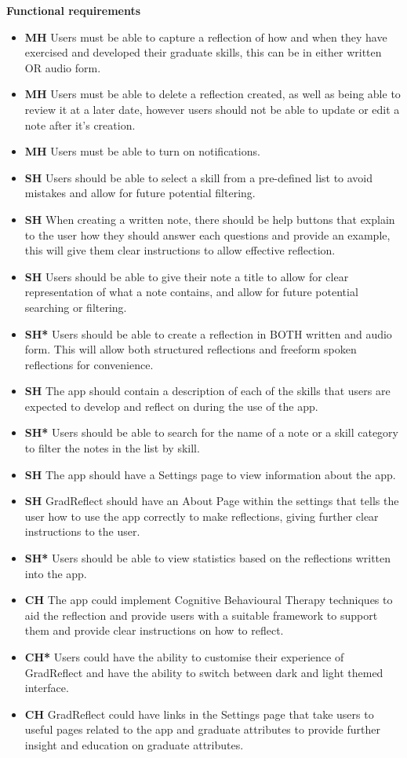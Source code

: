 \documentclass{l4proj}
\begin{document}
\textbf{Functional requirements}
\begin{itemize}
    \item \textbf{MH} Users must be able to capture a reflection of how and when they have exercised and developed their graduate skills, this can be in either written OR audio form.
    \item \textbf{MH} Users must be able to delete a reflection created, as well as being able to review it at a later date, however users should not be able to update or edit a note after it's creation. 
    \item \textbf{MH} Users must be able to turn on notifications.

    \item \textbf{SH} Users should be able to select a skill from a pre-defined list to avoid mistakes and allow for future potential filtering.
    \item \textbf{SH} When creating a written note, there should be help buttons that explain to the user how they should answer each questions and provide an example, this will give them clear instructions to allow effective reflection.
    \item \textbf{SH} Users should be able to give their note a title to allow for clear representation of what a note contains, and allow for future potential searching or filtering.
    \item \textbf{SH*} Users should be able to create a reflection in BOTH written and audio form. This will allow both structured reflections and freeform spoken reflections for convenience. 
    \item \textbf{SH} The app should contain a description of each of the skills that users are expected to develop and reflect on during the use of the app. 
    \item \textbf{SH*} Users should be able to search for the name of a note or a skill category to filter the notes in the list by skill.
    \item \textbf{SH} The app should have a Settings page to view information about the app.
    \item \textbf{SH} GradReflect should have an About Page within the settings that tells the user how to use the app correctly to make reflections, giving further clear instructions to the user. 
    \item \textbf{SH*} Users should be able to view statistics based on the reflections written into the app.
    
    \item \textbf{CH} The app could implement Cognitive Behavioural Therapy techniques to aid the reflection and provide users with a suitable framework to support them and provide clear instructions on how to reflect. 
    \item \textbf{CH*} Users could have the ability to customise their experience of GradReflect and have the ability to switch between dark and light themed interface.
    \item \textbf{CH} GradReflect could have links in the Settings page that take users to useful pages related to the app and graduate attributes to provide further insight and education on graduate attributes.
    

\end{itemize}
\end{document}
